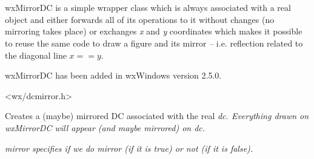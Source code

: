 
\section{}\label{wxmirrordc}

wxMirrorDC is a simple wrapper class which is always associated with a real 
 object and either forwards all of its operations to it
without changes (no mirroring takes place) or exchanges {\it x} and {\it y} 
coordinates which makes it possible to reuse the same code to draw a figure and
its mirror -- i.e. reflection related to the diagonal line $x == y$.

wxMirrorDC has been added in wxWindows version 2.5.0.




<wx/dcmirror.h>



\label{wxmirrordcwxmirrordc}


Creates a (maybe) mirrored DC associated with the real \it{dc}. Everything
drawn on wxMirrorDC will appear (and maybe mirrored) on \it{dc}.

\it{mirror} specifies if we do mirror (if it is \it{true}) or not (if it is 
\it{false}).


